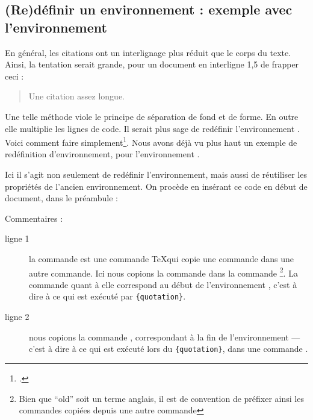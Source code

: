 \subsection[Rédéfinir un environnement : quotation]{(Re)définir un environnement : exemple avec l'environnement }

En général, les citations ont un interlignage plus réduit que le corps du texte. Ainsi, la tentation serait grande, pour un document en interligne 1,5 de frapper ceci :

\begin{latexcode}
\begin{singlespace}
\begin{quotation}
Une citation assez longue.
\end{quotation}
\end{singlespace}
\end{latexcode}

Une telle méthode viole le principe de séparation de fond et de forme. En outre elle multiplie les lignes de code. Il serait plus sage de redéfinir l'environnement . Voici comment faire simplement\footcite[Nous nous somme basés sur la classe  :][]{bredele}. Nous avons déjà vu plus haut un exemple de redéfinition d'environnement, pour l'environnement . 

Ici il s'agit non seulement de redéfinir l'environnement, mais aussi de réutiliser les propriétés de l'ancien environnement. On procède en insérant ce code en début de document, dans le préambule :

\begin{latexcode}
\let\oldquotation\quotation
\let\endoldquotation\endquotation
\renewenvironment{quotation}
    {\begin{oldquotation}\singlespace}
        {\end{oldquotation}}
\end{latexcode}

Commentaires : 

\begin{description}
\item[ligne 1] la commande  est une commande \TeX qui copie une commande dans une autre commande. Ici nous copions la commande  dans la commande \footnote{Bien que \enquote{old} soit un terme anglais, il est de convention de préfixer ainsi les commandes copiées depuis une autre commande}. La commande  quant à elle correspond au début de l'environnement , c'est à dire à ce qui est exécuté par \verb|{quotation}|.
\item[ligne 2] nous copions la commande , correspondant à la fin de l'environnement   --- c'est à dire à ce qui est exécuté lors du \verb|{quotation}|, dans une commande .
\end{description}


